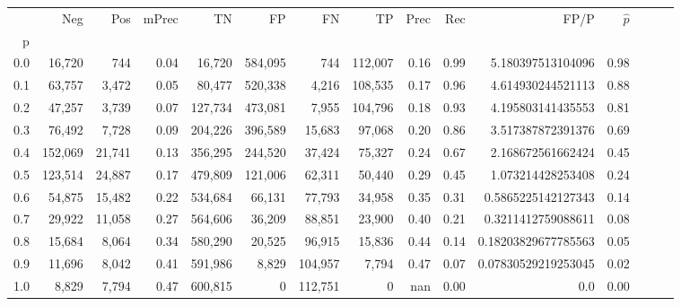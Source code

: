 \begin{tabular}{rrrrrrrrrrrrrrr}
\toprule
{} &      Neg &     Pos & mPrec &       TN &       FP &       FN &       TP &  Prec &   Rec &                 FP/P & $\hat{p}$ \\
p   &          &         &       &          &          &          &          &       &       &                      &           \\
\midrule
0.0 &   16,720 &     744 &  0.04 &   16,720 &  584,095 &      744 &  112,007 &  0.16 &  0.99 &    5.180397513104096 &      0.98 \\
0.1 &   63,757 &   3,472 &  0.05 &   80,477 &  520,338 &    4,216 &  108,535 &  0.17 &  0.96 &    4.614930244521113 &      0.88 \\
0.2 &   47,257 &   3,739 &  0.07 &  127,734 &  473,081 &    7,955 &  104,796 &  0.18 &  0.93 &    4.195803141435553 &      0.81 \\
0.3 &   76,492 &   7,728 &  0.09 &  204,226 &  396,589 &   15,683 &   97,068 &  0.20 &  0.86 &    3.517387872391376 &      0.69 \\
0.4 &  152,069 &  21,741 &  0.13 &  356,295 &  244,520 &   37,424 &   75,327 &  0.24 &  0.67 &    2.168672561662424 &      0.45 \\
0.5 &  123,514 &  24,887 &  0.17 &  479,809 &  121,006 &   62,311 &   50,440 &  0.29 &  0.45 &    1.073214428253408 &      0.24 \\
0.6 &   54,875 &  15,482 &  0.22 &  534,684 &   66,131 &   77,793 &   34,958 &  0.35 &  0.31 &   0.5865225142127343 &      0.14 \\
0.7 &   29,922 &  11,058 &  0.27 &  564,606 &   36,209 &   88,851 &   23,900 &  0.40 &  0.21 &   0.3211412759088611 &      0.08 \\
0.8 &   15,684 &   8,064 &  0.34 &  580,290 &   20,525 &   96,915 &   15,836 &  0.44 &  0.14 &  0.18203829677785563 &      0.05 \\
0.9 &   11,696 &   8,042 &  0.41 &  591,986 &    8,829 &  104,957 &    7,794 &  0.47 &  0.07 &  0.07830529219253045 &      0.02 \\
1.0 &    8,829 &   7,794 &  0.47 &  600,815 &        0 &  112,751 &        0 &   nan &  0.00 &                  0.0 &      0.00 \\
\bottomrule
\end{tabular}
